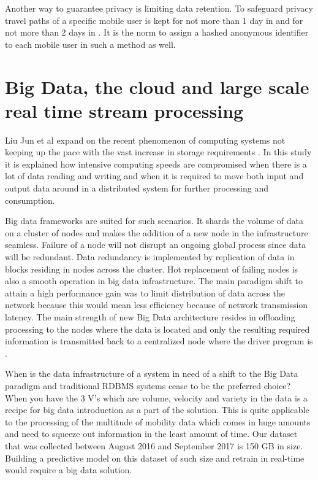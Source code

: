 \documentclass[12pt, a4paper]{report}
\theoremstyle{definition}
\theoremstyle{definition}%
\theoremstyle{definition}%
\theoremstyle{definition}%
\theoremstyle{definition}%
\theoremstyle{definition}%
\begin{document}
Another way to guarantee privacy is limiting data retention. To safeguard privacy travel paths of a specific mobile user is kept for not more than 1 day in \cite{Hoteit2014} and for not more than 2 days in \cite{Calabrese2013}. It is the norm to assign a hashed anonymous identifier to each mobile user in such a method as well.


\section{Big Data, the cloud and large scale real time stream processing} \label{background_big_data}

Liu Jun et al expand on the recent phenomenon of computing systems not keeping up the pace with the vast increase in storage requirements \cite{Liu2014}. In this study it is explained how intensive computing speeds are compromised when there is a lot of data reading and writing and when it is required to move both input and output data around in a distributed system for further processing and consumption. 

Big data frameworks are suited for such scenarios. It shards the volume of data on a cluster of nodes and makes the addition of a new node in the infrastructure seamless. Failure of a node will not disrupt an ongoing global process since data will be redundant. Data redundancy is implemented by replication of data in blocks residing in nodes across the cluster. Hot replacement of failing nodes is also a smooth operation in big data infrastructure. The main paradigm shift to attain a high performance gain was to limit distribution of data across the network because this would mean less efficiency because of network transmission latency. The main strength of new Big Data architecture resides in offloading processing to the nodes where the data is located and only the resulting required information is transmitted back to a centralized node where the driver program is \cite{inoubli2016experimental}.

When is the data infrastructure of a system in need of a shift to the Big Data paradigm and traditional RDBMS systems cease to be the preferred choice? When you have the 3 V's which are volume, velocity and variety in the data is a recipe for big data introduction as a part of the solution. This is quite applicable to the processing of the multitude of mobility data which comes in huge amounts and need to squeeze out information in the least amount of time. Our dataset that was collected between August 2016 and September 2017 is 150 GB in size. Building a predictive model on this dataset of such size and retrain in real-time would require a big data solution. 
\end{document}
